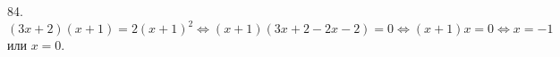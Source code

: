 84. $(3x+2)(x+1)=2(x+1)^2\Leftrightarrow(x+1)(3x+2-2x-2)=0\Leftrightarrow (x+1)x=0\Leftrightarrow x=-1$ или $x=0.$\\
